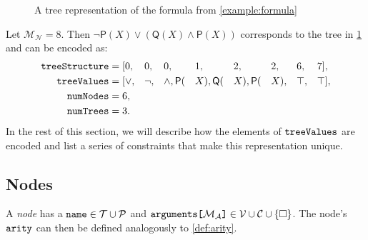 \documentclass[runningheads]{llncs}
\newcommand{\variable}[1]{\texttt{\textup{#1}}}
\newcommand{\arrayd}[3]{\variable{{#1}[}{#2}\variable{]} \in {#3}}
\newcommand{\predicates}{\mathcal{P}}
\newcommand{\variables}{\mathcal{V}}
\newcommand{\constants}{\mathcal{C}}
\newcommand{\tokens}{\mathcal{T}}
\newcommand{\maxArity}{\mathcal{M}_{\mathcal{A}}}
\newcommand{\maxNumNodes}{\mathcal{M}_{\mathcal{N}}}
\begin{document}
\begin{figure}[t]
  \centering
  \caption{A tree representation of the formula from \cref{example:formula}}
  \label{fig:example_tree}
\end{figure}

\begin{example} \label{example:formula}
  Let $\maxNumNodes{} = 8$. Then $\neg\mathsf{P}(X) \lor (\mathsf{Q}(X)
  \land \mathsf{P}(X))$ corresponds to the tree in \cref{fig:example_tree} and
  can be encoded as:
  \begin{alignat*}{8}
    \variable{treeStructure} &= [0, &&0, &&0, &&1, &&2, &&2, &&6, &&7],\\
    \variable{treeValues} &= [{\lor}, &&{\neg}, &&{\land}, \mathsf{P}(&&X), \mathsf{Q}(&&X), \mathsf{P}(&&X), &&\top, &&\top],\\
    \variable{numNodes} &= 6, && && && && && && &&\\
    \variable{numTrees} &= 3. && && && && && && &&
  \end{alignat*}
  In the rest of this section, we will describe how the elements of
  $\variable{treeValues}$ are encoded and list a series of constraints that make
  this representation unique.
\end{example}

\subsection{Nodes}

\begin{definition} \label{def:node}
  A \emph{node} has a $\variable{name} \in \tokens{} \cup \predicates{}$ and
  $\arrayd{arguments}{\maxArity{}}{\variables{} \cup \constants{} \cup \{ \Box
    \}}$. The node's $\variable{arity}$ can then be
  defined analogously to \cref{def:arity}.
\end{definition}
\end{document}
